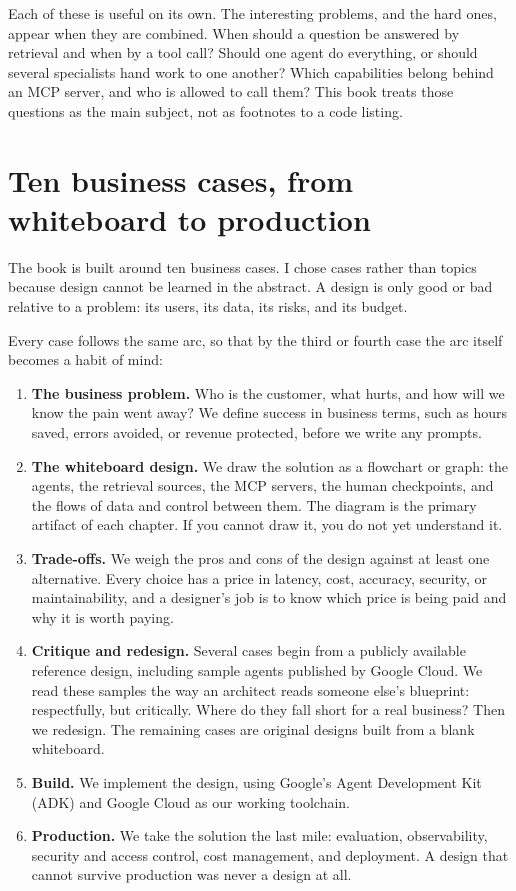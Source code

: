 Each of these is useful on its own. The interesting problems, and the hard
ones, appear when they are combined. When should a question be answered by
retrieval and when by a tool call? Should one agent do everything, or should
several specialists hand work to one another? Which capabilities belong behind
an MCP server, and who is allowed to call them? This book treats those questions
as the main subject, not as footnotes to a code listing.

\section*{Ten business cases, from whiteboard to production}

The book is built around ten business cases. I chose cases rather than topics
because design cannot be learned in the abstract. A design is only good or bad
relative to a problem: its users, its data, its risks, and its budget.

Every case follows the same arc, so that by the third or fourth case the arc
itself becomes a habit of mind:

\begin{enumerate}
  \item \textbf{The business problem.} Who is the customer, what hurts, and how
        will we know the pain went away? We define success in business terms,
        such as hours saved, errors avoided, or revenue protected, before we write
        any prompts.
  \item \textbf{The whiteboard design.} We draw the solution as a flowchart or
        graph: the agents, the retrieval sources, the MCP servers, the human
        checkpoints, and the flows of data and control between them. The
        diagram is the primary artifact of each chapter. If you cannot draw it,
        you do not yet understand it.
  \item \textbf{Trade-offs.} We weigh the pros and cons of the design against at
        least one alternative. Every choice has a price in latency, cost,
        accuracy, security, or maintainability, and a designer's job is to know
        which price is being paid and why it is worth paying.
  \item \textbf{Critique and redesign.} Several cases begin from a publicly
        available reference design, including sample agents published by
        Google Cloud. We read these samples the way an architect reads someone
        else's blueprint: respectfully, but critically. Where do they fall
        short for a real business? Then we redesign. The remaining cases are
        original designs built from a blank whiteboard.
  \item \textbf{Build.} We implement the design, using Google's Agent
        Development Kit (ADK) and Google Cloud as our working toolchain.
  \item \textbf{Production.} We take the solution the last mile: evaluation,
        observability, security and access control, cost management, and
        deployment. A design that cannot survive production was never a design
        at all.
\end{enumerate}

